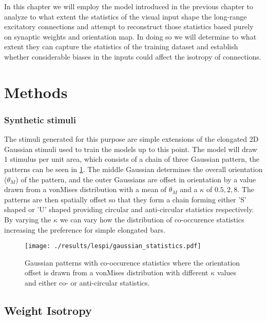 In this chapter we will employ the model introduced in the previous
chapter to analyze to what extent the statistics of the visual input
shape the long-range excitatory connections and attempt to reconstruct
those statistics based purely on synaptic weights and orientation
map. In doing so we will determine to what extent they can capture the
statistics of the training dataset and establish whether considerable
biases in the inputs could affect the isotropy of connections.

\section{Methods}

\subsubsection{Synthetic stimuli}

The stimuli generated for this purpose are simple extensions of the
elongated 2D Gaussian stimuli used to train the models up to this
point. The model will draw 1 stimulus per unit area, which consists of
a chain of three Gaussian pattern, the patterns can be seen in
\ref{GaussianStatistics}. The middle Gaussian determines the overall
orientation ($\theta_M$) of the pattern, and the outer Gaussians are
offset in orientation by a value drawn from a vonMises distribution
with a mean of $\theta_M$ and a $\kappa$ of ${0.5, 2, 8}$. The
patterns are then spatially offset so that they form a chain forming
either 'S' shaped or 'U' shaped providing circular and anti-circular
statistics respectively. By varying the $\kappa$ we can vary how the
distribution of co-occurence statistics increasing the preference for
simple elongated bars.

\begin{figure}
	\centering
	\texttt{[image: ./results/lespi/gaussian\_statistics.pdf]}
	\caption[Example of Gaussian patterns with co-occurence
      statistics] {Gaussian patterns with co-occurence statistics
      where the orientation offset is drawn from a vonMises
      distribution with different $\kappa$ values and either co- or
      anti-circular statistics.}
    \label{GaussianStatistics}
\end{figure}

\subsection{Weight Isotropy}

